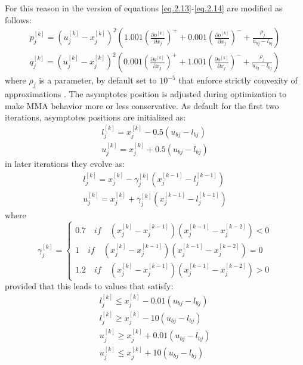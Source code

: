 For this reason in the version of \cite{svanberg2007mma} equations \ref{eq.2.13}-\ref{eq.2.14} are modified as follows:
\begin{eqnarray}
p_j^{[k]}=\left(u_j^{[k]}-x_j^{[k]}\right)^2\left(1.001\left(\frac{\partial o^{[k]}}{\partial x_j}\right)^++0.001\left(\frac{\partial o^{[k]}}{\partial x_j}\right)^-+\frac{\rho_j}{u_{bj}-l_{bj}}\right)\\
q_j^{[k]}=\left(u_j^{[k]}-x_j^{[k]}\right)^2\left(0.001\left(\frac{\partial o^{[k]}}{\partial x_j}\right)^++1.001\left(\frac{\partial o^{[k]}}{\partial x_j}\right)^-+\frac{\rho_j}{u_{bj}-l_{bj}}\right)
\end{eqnarray}
where $\rho_j$ is a parameter, by default set to $10^{-5}$ that enforce strictly convexity of approximations \cite{svanberg2007mma}. The asymptotes position is adjusted during optimization to make MMA behavior more or less conservative. 
As default for the first two iterations, asymptotes positions are initialized as:
\begin{eqnarray}
l_j^{[k]}=x_j^{[k]}-0.5\left(u_{bj}-l_{bj}\right)\\
u_j^{[k]}=x_j^{[k]}+0.5\left(u_{bj}-l_{bj}\right)
\end{eqnarray}
in later iterations they evolve as:
\begin{eqnarray}
l_j^{[k]}=x_j^{[k]}-\gamma_j^{[k]}\left(x_j^{[k-1]}-l_j^{[k-1]}\right)\\
u_j^{[k]}=x_j^{[k]}+\gamma_j^{[k]}\left(x_j^{[k-1]}-l_j^{[k-1]}\right)
\end{eqnarray}
where
\begin{equation}
\gamma_j^{[k]}=\begin{cases}
0.7 \quad \textit{if} \quad \left(x_j^{[k]}-x_j^{[k-1]}\right)\left(x_j^{[k-1]}-x_j^{[k-2]}\right)<0\\
1 \quad \textit{if} \quad \left(x_j^{[k]}-x_j^{[k-1]}\right)\left(x_j^{[k-1]}-x_j^{[k-2]}\right)=0\\
1.2 \quad \textit{if} \quad \left(x_j^{[k]}-x_j^{[k-1]}\right)\left(x_j^{[k-1]}-x_j^{[k-2]}\right)>0
\end{cases}
\end{equation}
provided that this leads to values that satisfy:
\begin{eqnarray}
l_j^{[k]}\leq x_j^{[k]}-0.01\left(u_{bj}-l_{bj}\right)\\
\label{eqnMNAl}
l_j^{[k]}\geq x_j^{[k]}-10\left(u_{bj}-l_{bj}\right)\\
u_j^{[k]}\geq x_j^{[k]}+0.01\left(u_{bj}-l_{bj}\right)\\
\label{eqnMNAu}
u_j^{[k]}\leq x_j^{[k]}+10\left(u_{bj}-l_{bj}\right)
\end{eqnarray}

